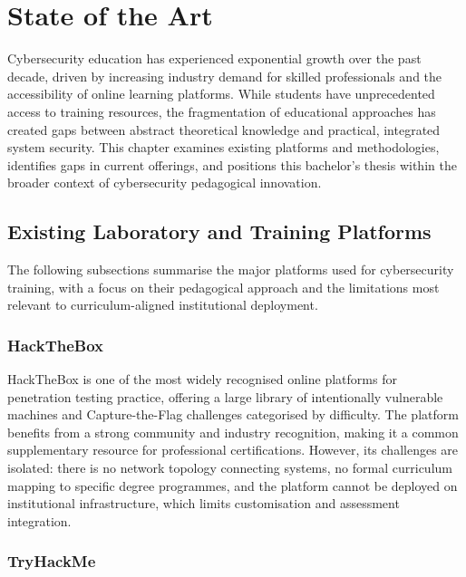 
\chapter{State of the Art}

Cybersecurity education has experienced exponential growth over the past decade, driven by
increasing industry demand for skilled professionals and the accessibility of online learning
platforms. While students have unprecedented access to training resources, the fragmentation
of educational approaches has created gaps between abstract theoretical knowledge and practical,
integrated system security. This chapter examines existing platforms and methodologies, identifies
gaps in current offerings, and positions this bachelor's thesis within the broader context of
cybersecurity pedagogical innovation.


\section{Existing Laboratory and Training Platforms}

The following subsections summarise the major platforms used for cybersecurity training,
with a focus on their pedagogical approach and the limitations most relevant to
curriculum-aligned institutional deployment.

\subsection{HackTheBox}

HackTheBox \cite{hackthebox} is one of the most widely recognised online platforms for
penetration testing practice, offering a large library of intentionally vulnerable machines and
Capture-the-Flag challenges categorised by difficulty. The platform benefits from a strong
community and industry recognition, making it a common supplementary resource for
professional certifications. However, its challenges are isolated: there is no network topology
connecting systems, no formal curriculum mapping to specific degree programmes, and the
platform cannot be deployed on institutional infrastructure, which limits customisation and
assessment integration.

\subsection{TryHackMe}

